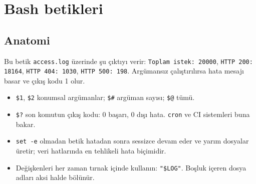 \documentclass[11pt,a4paper]{article}
\begin{document}
\section{Bash betikleri}

\subsection{Anatomi}
Bu betik \texttt{access.log} üzerinde şu çıktıyı verir: \texttt{Toplam istek: 20000}, \texttt{HTTP 200: 18164}, \texttt{HTTP 404: 1030}, \texttt{HTTP 500: 198}. Argümansız çalıştırılırsa hata mesajı basar ve çıkış kodu 1 olur.
\begin{itemize}
  \item \texttt{\$1}, \texttt{\$2} konumsal argümanlar; \texttt{\$\#} argüman sayısı; \texttt{\$@} tümü.
  \item \texttt{\$?} son komutun çıkış kodu: 0 başarı, 0 dışı hata. \texttt{cron} ve CI sistemleri buna bakar.
  \item \texttt{set -e} olmadan betik hatadan sonra sessizce devam eder ve yarım dosyalar üretir; veri hatlarında en tehlikeli hata biçimidir.
  \item Değişkenleri her zaman tırnak içinde kullanın: \texttt{"\$LOG"}. Boşluk içeren dosya adları aksi halde bölünür.
\end{itemize}
\end{document}
